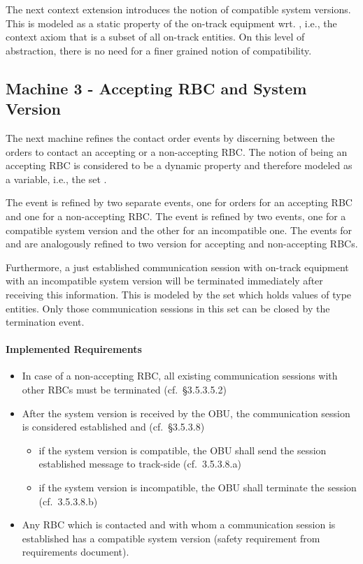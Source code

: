 \documentclass{template/openetcs_article}
\begin{document}
The next context extension introduces the notion of compatible system
versions. This is modeled as a static property of the on-track equipment
wrt. , i.e., the context axiom that
 is a subset of all on-track entities. On this
level of abstraction, there is no need for a finer grained notion of
compatibility.

%

\subsection{Machine 3 - Accepting RBC and System Version}
\label{sec:machine-3-accepting}

The next machine refines the contact order events by discerning between the
orders to contact an accepting or a non-accepting RBC. The notion of being an
accepting RBC is considered to be a dynamic property and therefore modeled as a
variable, i.e., the set .

The  event is refined by two separate events, one
for orders for an accepting RBC and one for a non-accepting RBC. The
 event is refined by two events, one for a
compatible system version and the other for an incompatible one. The events for
 and 
are analogously refined to two version for accepting and non-accepting RBCs.

Furthermore, a just established communication session with on-track equipment
with an incompatible system version will be terminated immediately after
receiving this information. This is modeled by the set
 which holds values of type entities. Only those
communication sessions in this set can be closed by the termination event.

\paragraph{Implemented Requirements}
\label{sec:impl-requ-2}

\begin{itemize}
\item In case of a non-accepting RBC, all existing communication sessions with
  other RBCs must be terminated (cf.~§3.5.3.5.2)
\item After the system version  is received by the OBU, the communication
  session is considered established and (cf.~§3.5.3.8)
  \begin{itemize}
  \item if the system version is compatible, the OBU shall send the session
    established message to track-side (cf.~3.5.3.8.a)
  \item if the system version is incompatible, the OBU shall terminate the
    session (cf.~3.5.3.8.b)
  \end{itemize}
\item Any RBC which is contacted and with whom a communication session is
  established has a compatible system version (safety requirement from
  requirements document).
\end{itemize}
\end{document}
